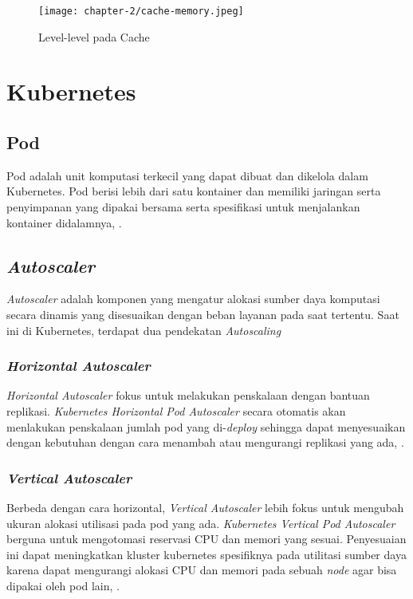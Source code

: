 \begin{figure}[h]
    \centering
    \texttt{[image: chapter-2/cache-memory.jpeg]}
    \caption{Level-level pada Cache}
    \label{fig:cache-level}
\end{figure}

\section{Kubernetes}

\subsection{Pod}
Pod adalah unit komputasi terkecil yang dapat dibuat dan dikelola dalam Kubernetes. Pod berisi lebih dari satu kontainer dan memiliki jaringan serta penyimpanan yang dipakai bersama serta spesifikasi untuk menjalankan kontainer didalamnya, \parencite{pod}.

\subsection{\textit{Autoscaler}}
\textit{Autoscaler} adalah komponen yang mengatur alokasi sumber daya komputasi secara dinamis yang disesuaikan dengan beban layanan pada saat tertentu. Saat ini di Kubernetes, terdapat dua pendekatan \textit{Autoscaling} 

\subsubsection{\textit{Horizontal Autoscaler}}
\textit{Horizontal Autoscaler} fokus untuk melakukan penskalaan dengan bantuan replikasi. \textit{Kubernetes Horizontal Pod Autoscaler} secara otomatis akan menlakukan penskalaan jumlah pod yang di-\textit{deploy} sehingga dapat menyesuaikan dengan kebutuhan dengan cara menambah atau mengurangi replikasi yang ada, \parencite{hpa}. 

\subsubsection{\textit{Vertical Autoscaler}}
Berbeda dengan cara horizontal, \textit{Vertical Autoscaler} lebih fokus untuk mengubah ukuran alokasi utilisasi pada pod yang ada. \textit{Kubernetes Vertical Pod Autoscaler} berguna untuk mengotomasi reservasi CPU dan memori yang sesuai. Penyesuaian ini dapat meningkatkan kluster kubernetes spesifiknya pada utilitasi sumber daya karena dapat mengurangi alokasi CPU dan memori pada sebuah \textit{node} agar bisa dipakai oleh pod lain, \parencite{vpa2}.

